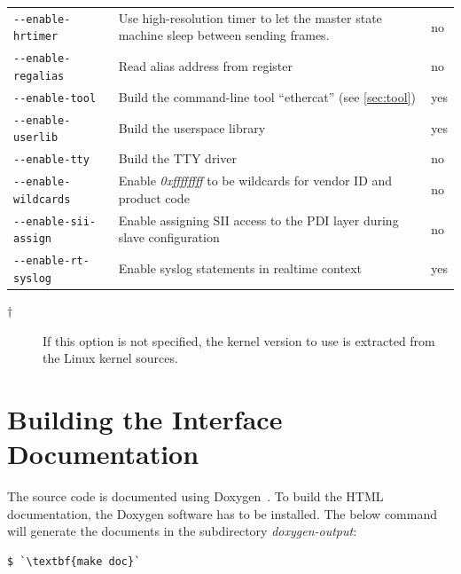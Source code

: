 \documentclass[a4paper,12pt,BCOR6mm,bibtotoc,idxtotoc]{scrbook}
\begin{document}
\begin{longtable}{l|p{}|l}
\lstinline+--enable-hrtimer+ & Use high-resolution timer to let the master
state machine sleep between sending frames. & no\\

\lstinline+--enable-regalias+ & Read alias address from register & no\\

\lstinline+--enable-tool+ & Build the command-line tool ``ethercat'' (see
\autoref{sec:tool}) & yes\\

\lstinline+--enable-userlib+ & Build the userspace library & yes\\

\lstinline+--enable-tty+ & Build the TTY driver & no\\

\lstinline+--enable-wildcards+ & Enable \textit{0xffffffff} to be wildcards
for vendor ID and product code & no\\

\lstinline+--enable-sii-assign+ & Enable assigning SII access to the PDI layer
during slave configuration & no\\

\lstinline+--enable-rt-syslog+ & Enable syslog statements in realtime context &
yes\\

\hline

\end{longtable}

\begin{description}

\item[$\dagger$] If this option is not specified, the kernel version to use is
extracted from the Linux kernel sources.

\end{description}

\section{Building the Interface Documentation}
\label{sec:gendoc}

The source code is documented using Doxygen~\cite{doxygen}. To build the HTML
documentation, the Doxygen software has to be installed. The below command
will generate the documents in the subdirectory \textit{doxygen-output}:

\begin{lstlisting}
$ `\textbf{make doc}`
\end{lstlisting}
\end{document}
